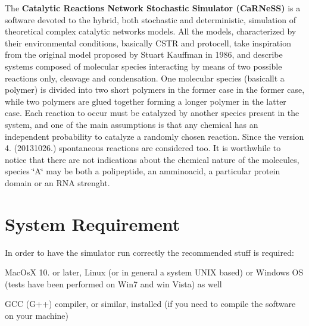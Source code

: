 

 The {\bfseries Catalytic Reactions Network Stochastic Simulator (Ca\-R\-Ne\-S\-S)} is a software devoted to the hybrid, both stochastic and deterministic, simulation of theoretical complex catalytic networks models. All the models, characterized by their environmental conditions, basically C\-S\-T\-R and protocell, take inspiration from the original model proposed by Stuart Kauffman in 1986, and describe systems composed of molecular species interacting by means of two possible reactions only, cleavage and condensation. One molecular species (basicallt a polymer) is divided into two short polymers in the former case in the former case, while two polymers are glued together forming a longer polymer in the latter case. Each reaction to occur must be catalyzed by another species present in the system, and one of the main assumptions is that any chemical has an independent probability to catalyze a randomly chosen reaction. Since the version 4. (20131026.) spontaneous reactions are considered too. It is worthwhile to notice that there are not indications about the chemical nature of the molecules, species \char`\"{}\-A\char`\"{} may be both a polipeptide, an amminoacid, a particular protein domain or an R\-N\-A strenght.\par
\par
 \hypertarget{a00001_sysreq}{}\section{System Requirement}\label{a00001_sysreq}


 In order to have the simulator run correctly the recommended stuff is required\-:
\begin{DoxyItemize}
\item Mac\-Os\-X 10. or later, Linux (or in general a system U\-N\-I\-X based) or Windows O\-S (tests have been performed on Win7 and win Vista) as well
\item G\-C\-C (G++) compiler, or similar, installed (if you need to compile the software on your machine)
\end{DoxyItemize}

